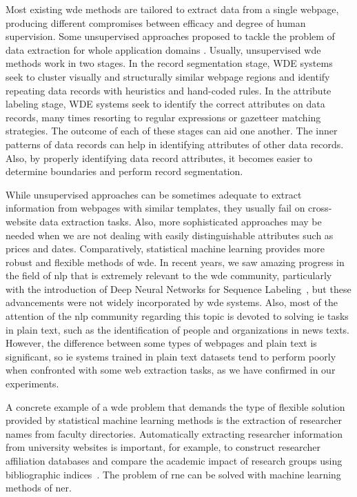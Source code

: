 \documentclass{nle}
\begin{document}
Most existing \gls{wde} methods are tailored to extract data 
from a single webpage, producing different compromises between efficacy and 
degree of human supervision. Some unsupervised approaches proposed to tackle 
the problem of data extraction for whole application domains 
\cite{Crescenzi2001}. Usually, 
unsupervised \gls{wde} methods work in two stages. In the record segmentation stage,
WDE systems seek to cluster visually and structurally similar webpage regions 
and identify repeating data records with heuristics and 
hand-coded rules. In the attribute labeling stage, WDE systems seek to identify 
the correct attributes on data records, many times resorting to regular expressions 
or gazetteer matching strategies. The outcome of each of these stages can aid one 
another. The inner patterns of data records can help in identifying attributes of other 
data records. Also, by properly identifying data record attributes, it becomes 
easier to determine boundaries and perform record segmentation.

While unsupervised approaches can be sometimes adequate to extract information from 
webpages with similar templates, they usually fail on cross-website data extraction 
tasks. Also, more sophisticated approaches may be needed when we are not dealing
with easily distinguishable attributes such as prices and dates. 
Comparatively, statistical machine learning provides more robust and flexible methods
of \gls{wde}. In recent years, we saw amazing progress in 
the field of \gls{nlp} that is extremely relevant to
the \gls{wde} community, particularly with the introduction of Deep Neural Networks 
for Sequence Labeling~\cite{Collobert2011}, but these advancements were 
not widely incorporated by \gls{wde} systems. Also, most of the attention of the \gls{nlp} community 
regarding this topic is devoted to solving \gls{ie} tasks in plain text, such as 
the identification of people and organizations in news texts.
However, the difference between some types of webpages and plain text is significant, so
\gls{ie} systems trained in plain text datasets tend to perform poorly 
when confronted with some web extraction tasks, as we have confirmed in our experiments.

A concrete example of a \gls{wde} problem that demands the type of
flexible solution provided by statistical machine learning methods is the extraction of 
researcher names from faculty directories. Automatically extracting researcher information 
from university websites is important, for example, to construct researcher affiliation databases 
and compare the academic impact of research groups using bibliographic indices~\cite{Ribas2015}. 
The problem of \gls{rne} can be solved with machine learning methods of 
\gls{ner}.
\end{document}
